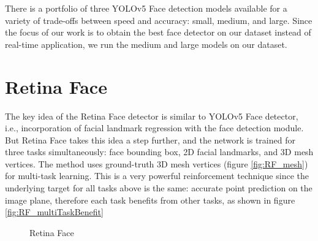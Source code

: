 There is a portfolio of three YOLOv5 Face detection models available for a variety of trade-offs between speed and accuracy: small, medium, and large. Since the focus of our work is to obtain the best face detector on our dataset instead of real-time application, we run the medium and large models on our dataset.


\section{Retina Face}
The key idea of the Retina Face detector \cite{retinaFace2020} is similar to YOLOv5 Face detector, i.e., incorporation of facial landmark regression with the face detection module. But Retina Face takes this idea a step further, and the network is trained for three tasks simultaneously: face bounding box, 2D facial landmarks, and 3D mesh vertices. The method uses ground-truth 3D mesh vertices (figure \ref{fig:RF_mesh}) for multi-task learning. This is a very powerful reinforcement technique since the underlying target for all tasks above is the same: accurate point prediction on the image plane, therefore each task benefits from other tasks, as shown in figure \ref{fig:RF_multiTaskBenefit}

\begin{figure}[h]
    \centering
    \captionsetup[subfigure]{justification=centering}
    \quad
    \caption{Retina Face}
\end{figure}


